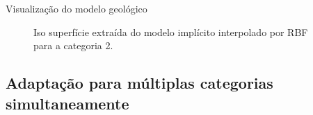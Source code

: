 \documentclass[aspectratio=169]{beamer}
\begin{document}
\begin{frame}{Visualização do modelo geológico}
\begin{figure}[H] 
	\caption{Iso superfície extraída do modelo implícito interpolado por RBF para a categoria 2.} \label{iso_cat2}
	\centering
\end{figure}
\end{frame}

\subsection{Adaptação para múltiplas categorias simultaneamente}
\end{document}
